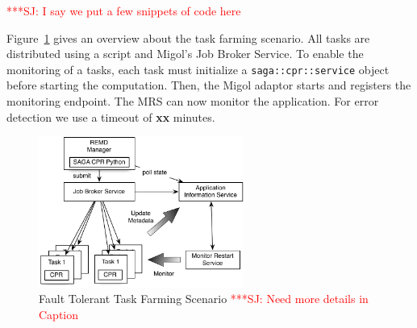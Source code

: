 \documentclass[times, 10pt,twocolumn]{article}
\newcommand{\jhanote}[1]{ {\textcolor{red} { ***SJ: #1 }}}
\begin{document}
\jhanote{I say we put a few snippets of code here}

\label{sec:exp}       

        
Figure~\ref{fig:saga-taskfarming} gives an overview about the task farming scenario. All tasks are
distributed using a script and Migol's Job Broker Service.
To enable the monitoring of a tasks, each task must initialize a \texttt{saga::cpr::service} object 
before starting the computation.  Then, the Migol adaptor starts and registers the monitoring endpoint. 
The MRS can now monitor the application.  For error detection we use a timeout of \textbf{xx} minutes.
\begin{figure}[t]
    \centering
        \includegraphics[width=0.6\textwidth]{saga-taskfarming}
    \caption{Fault Tolerant Task Farming Scenario \jhanote{Need more details in Caption} }
    \label{fig:saga-taskfarming}
\end{figure} 
\end{document}
